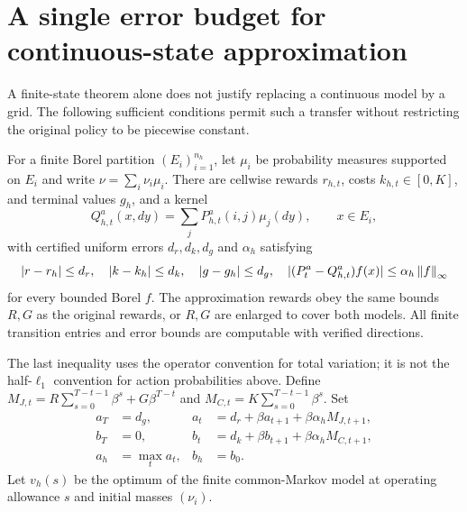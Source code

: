 \section{A single error budget for continuous-state approximation}\label{sec:transfer}
A finite-state theorem alone does not justify replacing a continuous model by a grid. The following sufficient conditions permit such a transfer without restricting the original policy to be piecewise constant.

\begin{assumption}\label{ass:reset}
For a finite Borel partition $(E_i)_{i=1}^{n_h}$, let $\mu_i$ be probability measures supported on $E_i$ and write $\nu=\sum_i\nu_i\mu_i$. There are cellwise rewards $r_{h,t}$, costs $k_{h,t}\in[0,K]$, and terminal values $g_h$, and a kernel
\[
 Q_{h,t}^a(x,dy)=\sum_j P_{h,t}^a(i,j)\mu_j(dy),\qquad x\in E_i,
\]
with certified uniform errors $d_r,d_k,d_g$ and $\alpha_h$ satisfying
\[
 |r-r_h|\leq d_r,\quad |k-k_h|\leq d_k,\quad |g-g_h|\leq d_g,
 \quad |(P_t^a-Q_{h,t}^a)f(x)|\leq\alpha_h\left\|f\right\|_\infty
\]
for every bounded Borel $f$. The approximation rewards obey the same bounds $R,G$ as the original rewards, or $R,G$ are enlarged to cover both models. All finite transition entries and error bounds are computable with verified directions.
\end{assumption}

The last inequality uses the operator convention for total variation; it is not the half-$\ell_1$ convention for action probabilities above. Define $M_{J,t}=R\sum_{s=0}^{T-t-1}\beta^s+G\beta^{T-t}$ and $M_{C,t}=K\sum_{s=0}^{T-t-1}\beta^s$. Set
\begin{align}
 a_T&=d_g,& a_t&=d_r+\beta a_{t+1}+\beta\alpha_hM_{J,t+1},\label{eq:primitiveJ}\\
 b_T&=0,& b_t&=d_k+\beta b_{t+1}+\beta\alpha_hM_{C,t+1},\label{eq:primitiveC}\\
 a_h&=\max_t a_t,& b_h&=b_0.\nonumber
\end{align}
Let $v_h(s)$ be the optimum of the finite common-Markov model at operating allowance $s$ and initial masses $(\nu_i)$.


